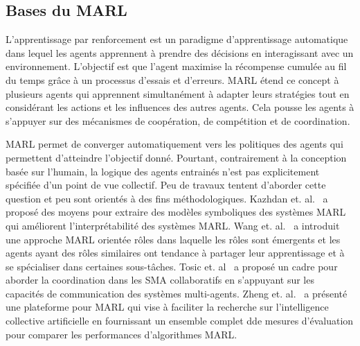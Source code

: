 \documentclass[contribution]{jfsma}
\begin{document}

\subsection{Bases du MARL}

L'apprentissage par renforcement est un paradigme d'apprentissage automatique dans lequel les agents apprennent à prendre des décisions en interagissant avec un environnement. L’objectif est que l’agent maximise la récompense cumulée au fil du temps grâce à un processus d’essais et d’erreurs.
MARL étend ce concept à plusieurs agents qui apprennent simultanément à adapter leurs stratégies tout en considérant les actions et les influences des autres agents. Cela pousse les agents à s’appuyer sur des mécanismes de coopération, de compétition et de coordination.

MARL permet de converger automatiquement vers les politiques des agents qui permettent d'atteindre l'objectif donné. Pourtant, contrairement à la conception basée sur l'humain, la logique des agents entrainés n'est pas explicitement spécifiée d'un point de vue collectif. Peu de travaux tentent d’aborder cette question et peu sont orientés à des fins méthodologiques.
Kazhdan et. al.~\cite{Kazhdan2020} a proposé des moyens pour extraire des modèles symboliques des systèmes MARL qui améliorent l'interprétabilité des systèmes MARL.
Wang et. al.~\cite{Wang2020} a introduit une approche MARL orientée rôles dans laquelle les rôles sont émergents et les agents ayant des rôles similaires ont tendance à partager leur apprentissage et à se spécialiser dans certaines sous-tâches.
Tosic et. al~\cite{Tosic2010} a proposé un cadre pour aborder la coordination dans les SMA collaboratifs en s'appuyant sur les capacités de communication des systèmes multi-agents.
Zheng et. al.~\cite{Zheng2018} a présenté une plateforme pour MARL qui vise à faciliter la recherche sur l'intelligence collective artificielle en fournissant un ensemble complet dde mesures d'évaluation pour comparer les performances d'algorithmes MARL.
\end{document}
